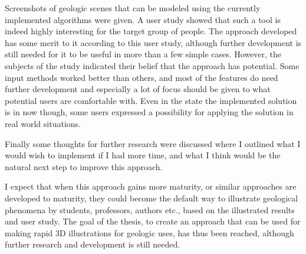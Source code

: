 \documentclass[a4paper,12pt]{report}
\begin{document}
Screenshots of geologic scenes that can be modeled using the currently implemented algorithms were given. A user study showed that such a tool is indeed highly interesting for the target group of people. The approach developed has some merit to it according to this user study, although further development is still needed for it to be useful in more than a few simple cases. However, the subjects of the study indicated their belief that the approach has potential. Some input methods worked better than others, and most of the features do need further development and especially a lot of focus should be given to what potential users are comfortable with. Even in the state the implemented solution is in now though, some users expressed a possibility for applying the solution in real world situations.

Finally some thoughts for further research were discussed where I outlined what I would wish to implement if I had more time, and what I think would be the natural next step to improve this approach.

I expect that when this approach gains more maturity, or similar approaches are developed to maturity, they could become the default way to illustrate geological phenomena by students, professors, authors etc., based on the illustrated results and user study. The goal of the thesis, to create an approach that can be used for making rapid 3D illustrations for geologic uses, has thus been reached, although further research and development is still needed.


{}

\end{document}

